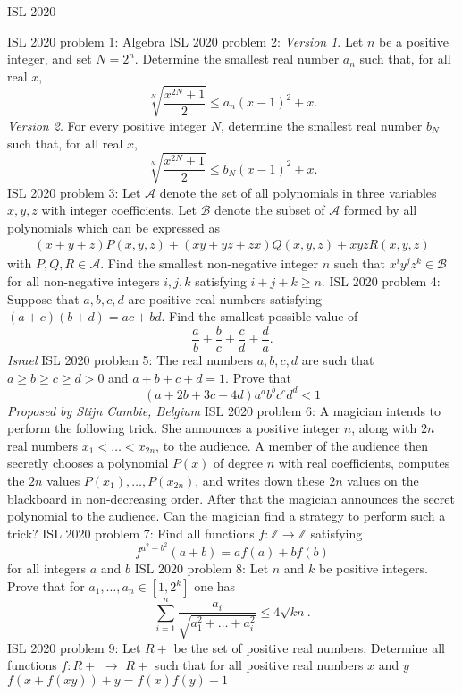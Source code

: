 
ISL 2020 

ISL 2020 problem 1:  Algebra 
ISL 2020 problem 2:  \textit{Version 1}. Let $n$ be a positive integer, and set $N=2^n$. Determine the smallest real number $a_n$ such that, for all real $x$,
\[ \sqrt[N]{\frac{x^{2 N}+1}{2}} \leqslant a_n(x-1)^2+x . \]
\textit{Version 2}. For every positive integer $N$, determine the smallest real number $b_N$ such that, for all real $x$,
\[ \sqrt[N]{\frac{x^{2 N}+1}{2}} \leqslant b_N(x-1)^2+x . \] 
ISL 2020 problem 3:  Let $\mathcal{A}$ denote the set of all polynomials in three variables $x, y, z$ with integer coefficients. Let $\mathcal{B}$ denote the subset of $\mathcal{A}$ formed by all polynomials which can be expressed as
\begin{align*}
(x + y + z)P(x, y, z) + (xy + yz + zx)Q(x, y, z) + xyzR(x, y, z)
\end{align*}
with $P, Q, R \in \mathcal{A}$.  Find the smallest non-negative integer $n$ such that $x^i y^j z^k \in \mathcal{B}$ for all non-negative integers $i, j, k$ satisfying $i + j + k \geq n$. 
ISL 2020 problem 4:  Suppose that $a,b,c,d$ are positive real numbers satisfying $(a+c)(b+d)=ac+bd$. Find the smallest possible value of
\[ \frac{a}{b}+\frac{b}{c}+\frac{c}{d}+\frac{d}{a}. \]
\textit{Israel} 
ISL 2020 problem 5:  The real numbers $a, b, c, d$ are such that $a\geq b\geq c\geq d>0$ and $a+b+c+d=1$. Prove that
\[ (a+2b+3c+4d)a^ab^bc^cd^d<1 \]
\textit{Proposed by Stijn Cambie, Belgium} 
ISL 2020 problem 6:  A magician intends to perform the following trick. She announces a positive integer $n$, along with $2n$ real numbers $x_1 < \dots < x_{2n}$, to the audience. A member of the audience then secretly chooses a polynomial $P(x)$ of degree $n$ with real coefficients, computes the $2n$ values $P(x_1), \dots , P(x_{2n})$, and writes down these $2n$ values on the blackboard in non-decreasing order. After that the magician announces the secret polynomial to the audience. Can the magician find a strategy to perform such a trick? 
ISL 2020 problem 7:  Find all functions $f : \mathbb{Z}\rightarrow \mathbb{Z}$ satisfying
\[ f^{a^2 + b^2}(a+b) = af(a) +bf(b) \]
for all integers $a$ and $b$ 
ISL 2020 problem 8:  Let $n$ and $k$ be positive integers. Prove that for $a_1, \dots, a_n \in [1,2^k]$ one has
\[ \sum_{i = 1}^n \frac{a_i}{\sqrt{a_1^2 + \dots + a_i^2}} \le 4 \sqrt{kn}. \] 
ISL 2020 problem 9:  Let $R+$ be the set of positive real numbers. Determine all functions $f:R+$ $\rightarrow$ $R+$ such that for all positive real numbers $x$ and $y$ \\
$f(x+f(xy))+y=f(x)f(y)+1$ \\\\
